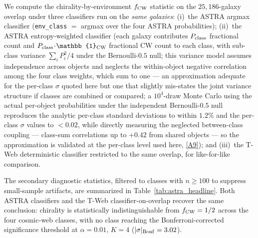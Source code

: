 \documentclass[twocolumn,linenumbers]{aastex702}
\newcommand{\repoBase}{https://github.com/Hubify-Projects/bigbounce/blob/main}
\begin{document}
We compute the chirality-by-environment $f_{\rm CW}$ statistic on the
$25{,}186$-galaxy overlap under three classifiers run on the
\emph{same galaxies}: (i)~the ASTRA argmax classifier
(\texttt{env\_class} $=$ argmax over the four ASTRA probabilities);
(ii)~the ASTRA entropy-weighted classifier (each galaxy contributes
$P_{\rm class}$ fractional count and $P_{\rm class}\!\cdot\!\mathbb{1}_{\rm CW}$
fractional CW count to each class, with sub-class variance
$\textstyle\sum_i P_i^2 / 4$ under the Bernoulli-$0.5$ null; this
variance model assumes independence across objects and neglects the
within-object negative correlation among the four class weights,
which sum to one --- an approximation adequate for the per-class
$\sigma$ quoted here but one that slightly mis-states the joint
variance structure if classes are combined or compared; a $10^4$-draw
Monte Carlo using the actual per-object probabilities under the
independent Bernoulli-$0.5$ null reproduces the analytic per-class
standard deviations to within $1.2\%$ and the per-class $\sigma$
values to $<\!0.02$, while directly measuring the neglected
between-class coupling --- class-sum correlations up to $+0.42$ from
shared objects --- so the approximation is validated at the per-class
level used here,
\href{\repoBase/pipelines/p5\_desi\_chirality/outputs/22\_r24conf\_local\_batch.json}{[A9]}); and
(iii)~the T-Web deterministic classifier restricted to the same
overlap, for like-for-like comparison.

The secondary diagnostic statistics, filtered to classes with $n \geq 100$ to
suppress small-sample artifacts, are summarized in
Table~\ref{tab:astra_headline}. Both ASTRA classifiers and the T-Web
classifier-on-overlap recover the same conclusion: chirality is
statistically indistinguishable from $f_{\rm CW} = 1/2$ across the
four cosmic-web classes, with no class reaching the
Bonferroni-corrected significance threshold at $\alpha = 0.01,\,K = 4$
($|\sigma|_{\rm Bonf} = 3.02$).
\end{document}
